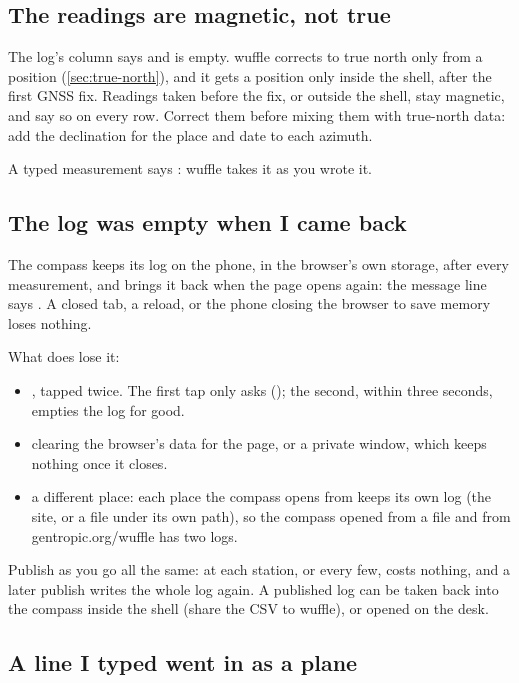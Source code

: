 \subsection{The readings are magnetic, not true}

The log's  column says  and  is empty. wuffle corrects to
true north only from a position (\cref{sec:true-north}), and it gets a position only inside the shell,
after the first GNSS fix. Readings taken before the fix, or outside the shell, stay magnetic, and say so
on every row. Correct them before mixing them with true-north data: add the declination for the place and
date to each azimuth.

A typed measurement says : wuffle takes it as you wrote it.

\subsection{The log was empty when I came back}

The compass keeps its log on the phone, in the browser's own storage, after every measurement, and
brings it back when the page opens again: the message line says . A closed tab, a reload, or the phone closing the browser to
save memory loses nothing.

What does lose it:
\begin{itemize}
\item {}, tapped twice. The first tap only asks (); the second, within three seconds, empties the log for
good.
\item clearing the browser's data for the page, or a private window, which keeps nothing once it closes.
\item a different place: each place the compass opens from keeps its own log (the site, or a file
under its own path), so the compass opened from a file and from gentropic.org/wuffle has two logs.
\end{itemize}

Publish as you go all the same:  at each station, or every few, costs nothing, and a later
publish writes the whole log again. A published log can be taken back into the compass inside the shell
(share the CSV to wuffle), or opened on the desk.

\subsection{A line I typed went in as a plane}

